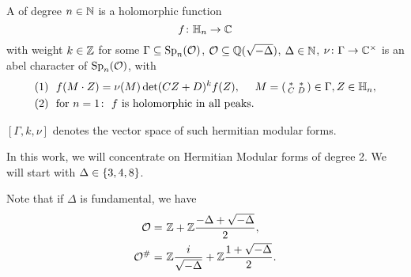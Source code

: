 A  of degree $n\in\mathbb{N}$
is a holomorphic function
\[ f \colon \mathbb{H}_n \rightarrow \mathbb{C} \]
with weight $k\in \mathbb{Z}$ for some $\Gamma \subseteq \operatorname{Sp}_n(\mathcal{O})$, $\mathcal{O} \subseteq \mathbb{Q}(\sqrt{-\Delta})$, $\Delta \in \mathbb{N}$, $\nu \colon \Gamma \rightarrow \mathbb{C}^\times$ is an abel character of $\operatorname{Sp}_n(\mathcal{O})$, with
\begin{align*}
(1) \ \ & f(M \cdot Z) = \nu(M) \det(CZ + D)^k f(Z), \ \ \ \ M = \left( \begin{smallmatrix} * & * \\ C & D \end{smallmatrix} \right) \in \Gamma, Z \in \mathbb{H}_n , \\
(2) \ \ & \text{for } n = 1 \colon \ \text{$f$ is holomorphic in all peaks} .
\end{align*}

$[\Gamma, k, \nu]$ denotes the vector space of such hermitian modular forms.

In this work, we will concentrate on Hermitian Modular forms of degree 2. We will start with $\Delta \in \Set{3,4,8}$.


Note that if $\Delta$ is fundamental, we have
\begin{align*}
\mathcal{O} = &\ \mathbb{Z} +  \mathbb{Z} \frac{-\Delta+\sqrt{-\Delta}}{2} , \\
\mathcal{O}^\# = & \ \mathbb{Z} \frac{i}{\sqrt{-\Delta}} + \mathbb{Z} \frac{1 + \sqrt{-\Delta}}{2} .
\end{align*}


